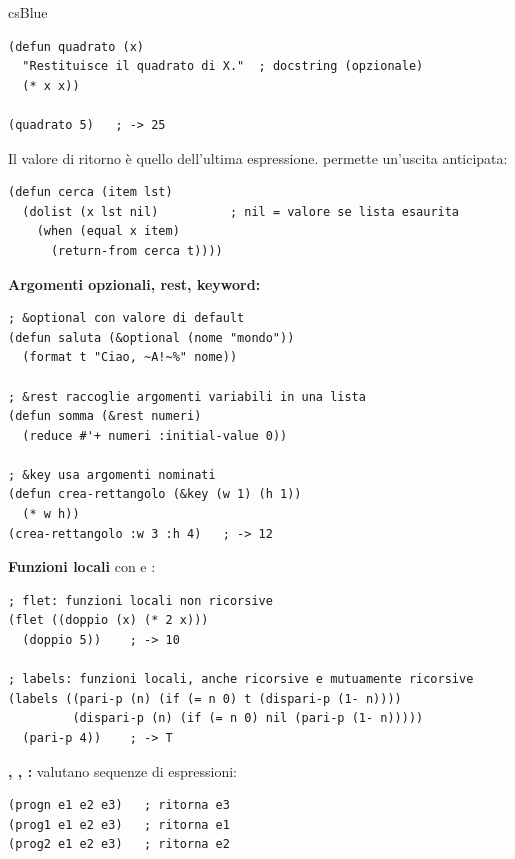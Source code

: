 \begin{refbox}{csBlue}
\label{sec:funzioni}

\begin{lstlisting}
(defun quadrato (x)
  "Restituisce il quadrato di X."  ; docstring (opzionale)
  (* x x))

(quadrato 5)   ; -> 25
\end{lstlisting}

Il valore di ritorno è quello dell'ultima espressione.
 permette un'uscita anticipata:

\begin{lstlisting}
(defun cerca (item lst)
  (dolist (x lst nil)          ; nil = valore se lista esaurita
    (when (equal x item)
      (return-from cerca t))))
\end{lstlisting}

\textbf{Argomenti opzionali, rest, keyword:}\nopagebreak
\begin{lstlisting}
; &optional con valore di default
(defun saluta (&optional (nome "mondo"))
  (format t "Ciao, ~A!~%" nome))

; &rest raccoglie argomenti variabili in una lista
(defun somma (&rest numeri)
  (reduce #'+ numeri :initial-value 0))

; &key usa argomenti nominati
(defun crea-rettangolo (&key (w 1) (h 1))
  (* w h))
(crea-rettangolo :w 3 :h 4)   ; -> 12
\end{lstlisting}

\textbf{Funzioni locali} con  e :\nopagebreak
\begin{lstlisting}
; flet: funzioni locali non ricorsive
(flet ((doppio (x) (* 2 x)))
  (doppio 5))    ; -> 10

; labels: funzioni locali, anche ricorsive e mutuamente ricorsive
(labels ((pari-p (n) (if (= n 0) t (dispari-p (1- n))))
         (dispari-p (n) (if (= n 0) nil (pari-p (1- n)))))
  (pari-p 4))    ; -> T
\end{lstlisting}

\textbf{, , :} valutano sequenze di espressioni:\nopagebreak
\begin{lstlisting}
(progn e1 e2 e3)   ; ritorna e3
(prog1 e1 e2 e3)   ; ritorna e1
(prog2 e1 e2 e3)   ; ritorna e2
\end{lstlisting}

\end{refbox}


